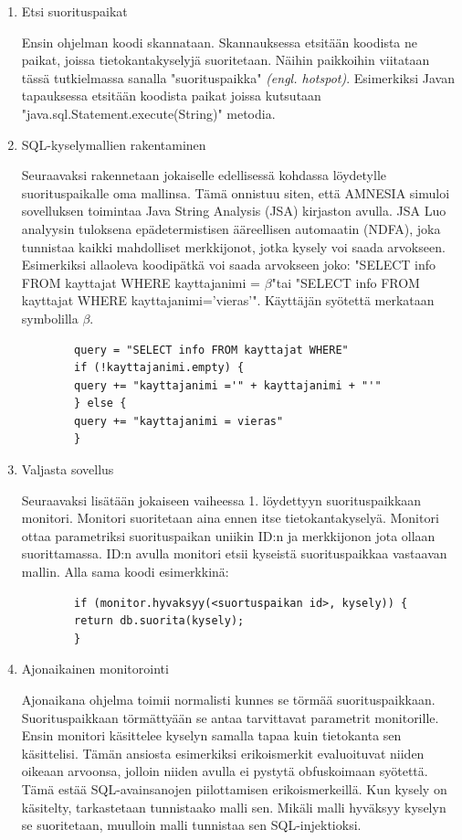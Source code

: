\documentclass[finnish]{tktltiki2}
\theoremstyle{definition}
\theoremstyle{remark}
\begin{document}
	\begin{enumerate}
		\item{Etsi suorituspaikat}
		
		Ensin ohjelman koodi skannataan. Skannauksessa etsitään koodista ne paikat, joissa tietokantakyselyjä suoritetaan. Näihin paikkoihin viitataan tässä tutkielmassa sanalla "suorituspaikka" \textit{(engl. hotspot)}. Esimerkiksi Javan tapauksessa etsitään koodista paikat joissa kutsutaan "java.sql.Statement.execute(String)" \space metodia.
		\item{SQL-kyselymallien rakentaminen}
		
		Seuraavaksi rakennetaan jokaiselle edellisessä kohdassa löydetylle suorituspaikalle oma mallinsa. Tämä onnistuu siten, että AMNESIA simuloi sovelluksen toimintaa Java String Analysis (JSA) kirjaston avulla. JSA Luo analyysin tuloksena epädetermistisen ääreellisen automaatin (NDFA), joka tunnistaa kaikki mahdolliset merkkijonot, jotka kysely voi saada arvokseen. Esimerkiksi allaoleva koodipätkä voi saada arvokseen joko: 
		"SELECT info FROM kayttajat WHERE kayttajanimi = $\beta$"\space tai "SELECT info FROM kayttajat WHERE kayttajanimi='vieras'". Käyttäjän syötettä merkataan symbolilla $\beta$.
		
		\begin{lstlisting}
		query = "SELECT info FROM kayttajat WHERE"
		if (!kayttajanimi.empty) {
		query += "kayttajanimi ='" + kayttajanimi + "'"
		} else {
		query += "kayttajanimi = vieras"
		}
		\end{lstlisting}
		
		
		\item{Valjasta sovellus}
		
		Seuraavaksi lisätään jokaiseen vaiheessa 1. löydettyyn suorituspaikkaan monitori. Monitori suoritetaan aina ennen itse tietokantakyselyä. Monitori ottaa parametriksi suorituspaikan uniikin ID:n ja merkkijonon jota ollaan suorittamassa. ID:n avulla monitori etsii kyseistä suorituspaikkaa vastaavan mallin. Alla sama koodi esimerkkinä: 
		\pagebreak
		\begin{lstlisting}
		if (monitor.hyvaksyy(<suortuspaikan id>, kysely)) {
		return db.suorita(kysely);
		}
		\end{lstlisting}
		\item{Ajonaikainen monitorointi}
		
		Ajonaikana ohjelma toimii normalisti kunnes se törmää suorituspaikkaan. Suorituspaikkaan törmättyään se antaa tarvittavat parametrit monitorille. Ensin monitori käsittelee kyselyn samalla tapaa kuin tietokanta sen käsittelisi. Tämän ansiosta esimerkiksi erikoismerkit evaluoituvat niiden oikeaan arvoonsa, jolloin niiden avulla ei pystytä obfuskoimaan syötettä. Tämä estää SQL-avainsanojen piilottamisen erikoismerkeillä. Kun kysely on käsitelty, tarkastetaan tunnistaako malli sen. Mikäli malli hyväksyy kyselyn se suoritetaan, muulloin malli tunnistaa sen SQL-injektioksi.
		

\end{enumerate}
\end{document}
